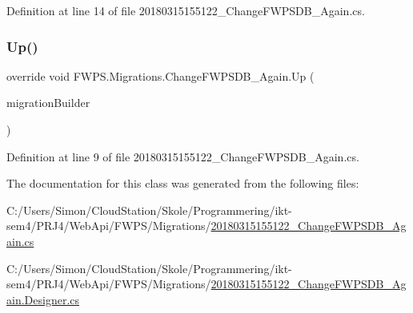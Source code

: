 Definition at line 14 of file 20180315155122\+\_\+\+Change\+F\+W\+P\+S\+D\+B\+\_\+\+Again.\+cs.

\mbox{\label{class_f_w_p_s_1_1_migrations_1_1_change_f_w_p_s_d_b___again_ab3ddf50d2bbd2a1a80dd27eafde0b453}} 
\subsubsection{\texorpdfstring{Up()}{Up()}}
{\footnotesize\ttfamily override void F\+W\+P\+S.\+Migrations.\+Change\+F\+W\+P\+S\+D\+B\+\_\+\+Again.\+Up (\begin{DoxyParamCaption}\item[{Migration\+Builder}]{migration\+Builder }\end{DoxyParamCaption})\hspace{0.3cm}{\ttfamily [protected]}}



Definition at line 9 of file 20180315155122\+\_\+\+Change\+F\+W\+P\+S\+D\+B\+\_\+\+Again.\+cs.



The documentation for this class was generated from the following files\+:\begin{DoxyCompactItemize}
\item 
C\+:/\+Users/\+Simon/\+Cloud\+Station/\+Skole/\+Programmering/ikt-\/sem4/\+P\+R\+J4/\+Web\+Api/\+F\+W\+P\+S/\+Migrations/\mbox{\hyperlink{20180315155122___change_f_w_p_s_d_b___again_8cs}{20180315155122\+\_\+\+Change\+F\+W\+P\+S\+D\+B\+\_\+\+Again.\+cs}}\item 
C\+:/\+Users/\+Simon/\+Cloud\+Station/\+Skole/\+Programmering/ikt-\/sem4/\+P\+R\+J4/\+Web\+Api/\+F\+W\+P\+S/\+Migrations/\mbox{\hyperlink{20180315155122___change_f_w_p_s_d_b___again_8_designer_8cs}{20180315155122\+\_\+\+Change\+F\+W\+P\+S\+D\+B\+\_\+\+Again.\+Designer.\+cs}}\end{DoxyCompactItemize}
